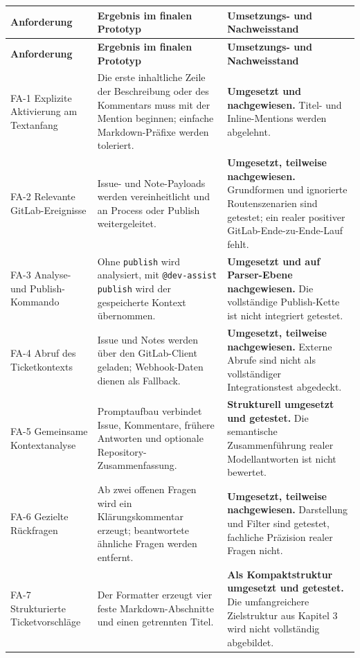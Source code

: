 \begin{longtable}{@{}>{\raggedright\arraybackslash}p{}>{\raggedright\arraybackslash}p{}>{\raggedright\arraybackslash}p{}@{}}
\toprule
\textbf{Anforderung} & \textbf{Ergebnis im finalen Prototyp} & \textbf{Umsetzungs- und Nachweisstand} \\
\midrule
\endfirsthead
\toprule
\textbf{Anforderung} & \textbf{Ergebnis im finalen Prototyp} & \textbf{Umsetzungs- und Nachweisstand} \\
\midrule
\endhead
FA-1 Explizite Aktivierung am Textanfang & Die erste inhaltliche Zeile der Beschreibung oder des Kommentars muss mit der Mention beginnen; einfache Markdown-Präfixe werden toleriert. & \textbf{Umgesetzt und nachgewiesen.} Titel- und Inline-Mentions werden abgelehnt. \\
FA-2 Relevante GitLab-Ereignisse & Issue- und Note-Payloads werden vereinheitlicht und an Process oder Publish weitergeleitet. & \textbf{Umgesetzt, teilweise nachgewiesen.} Grundformen und ignorierte Routenszenarien sind getestet; ein realer positiver GitLab-Ende-zu-Ende-Lauf fehlt. \\
FA-3 Analyse- und Publish-Kommando & Ohne \texttt{publish} wird analysiert, mit \texttt{@dev-assist publish} wird der gespeicherte Kontext übernommen. & \textbf{Umgesetzt und auf Parser-Ebene nachgewiesen.} Die vollständige Publish-Kette ist nicht integriert getestet. \\
FA-4 Abruf des Ticketkontexts & Issue und Notes werden über den GitLab-Client geladen; Webhook-Daten dienen als Fallback. & \textbf{Umgesetzt, teilweise nachgewiesen.} Externe Abrufe sind nicht als vollständiger Integrationstest abgedeckt. \\
FA-5 Gemeinsame Kontextanalyse & Promptaufbau verbindet Issue, Kommentare, frühere Antworten und optionale Repository-Zusammenfassung. & \textbf{Strukturell umgesetzt und getestet.} Die semantische Zusammenführung realer Modellantworten ist nicht bewertet. \\
FA-6 Gezielte Rückfragen & Ab zwei offenen Fragen wird ein Klärungskommentar erzeugt; beantwortete ähnliche Fragen werden entfernt. & \textbf{Umgesetzt, teilweise nachgewiesen.} Darstellung und Filter sind getestet, fachliche Präzision realer Fragen nicht. \\
FA-7 Strukturierte Ticketvorschläge & Der Formatter erzeugt vier feste Markdown-Abschnitte und einen getrennten Titel. & \textbf{Als Kompaktstruktur umgesetzt und getestet.} Die umfangreichere Zielstruktur aus Kapitel 3 wird nicht vollständig abgebildet. \\

\end{longtable}
